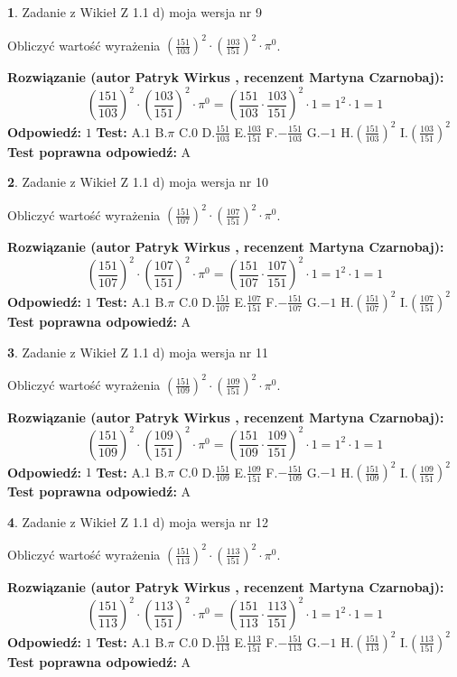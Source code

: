 \documentclass[12pt, a4paper]{article}
\theoremstyle{definition} %
\newtheorem{zad}{}
\newcommand{\zadStart}[1]{\begin{zad}#1\newline}
\newcommand{\zadStop}{\end{zad}}
\newcommand{\rozwStart}[2]{\noindent \textbf{Rozwiązanie (autor #1 , recenzent #2): }\newline}
\newcommand{\rozwStop}{\newline}
\newcommand{\odpStart}{\noindent \textbf{Odpowiedź:}\newline}
\newcommand{\odpStop}{\newline}
\newcommand{\testStart}{\noindent \textbf{Test:}\newline}
\newcommand{\testStop}{\newline}
\newcommand{\kluczStart}{\noindent \textbf{Test poprawna odpowiedź:}\newline}
\newcommand{\kluczStop}{\newline}
\begin{document}
\zadStart{Zadanie z Wikieł Z 1.1 d) moja wersja nr 9}

Obliczyć wartość wyrażenia $(\frac{151}{103})^{2} \cdot (\frac{103}{151})^{2} \cdot \pi^{0}$.
\zadStop
\rozwStart{Patryk Wirkus}{Martyna Czarnobaj}
$$(\frac{151}{103})^{2} \cdot (\frac{103}{151})^{2} \cdot \pi^{0} = (\frac{151}{103} \cdot \frac{103}{151})^{2} \cdot 1 = 1^{2} \cdot 1 = 1$$
\rozwStop
\odpStart
$1$
\odpStop
\testStart
A.$1$ B.$\pi$ C.$0$ D.$\frac{151}{103}$ E.$\frac{103}{151}$
F.$-\frac{151}{103}$ G.$-1$
H.$(\frac{151}{103})^{2}$
I.$(\frac{103}{151})^{2}$
\testStop
\kluczStart
A
\kluczStop



\zadStart{Zadanie z Wikieł Z 1.1 d) moja wersja nr 10}

Obliczyć wartość wyrażenia $(\frac{151}{107})^{2} \cdot (\frac{107}{151})^{2} \cdot \pi^{0}$.
\zadStop
\rozwStart{Patryk Wirkus}{Martyna Czarnobaj}
$$(\frac{151}{107})^{2} \cdot (\frac{107}{151})^{2} \cdot \pi^{0} = (\frac{151}{107} \cdot \frac{107}{151})^{2} \cdot 1 = 1^{2} \cdot 1 = 1$$
\rozwStop
\odpStart
$1$
\odpStop
\testStart
A.$1$ B.$\pi$ C.$0$ D.$\frac{151}{107}$ E.$\frac{107}{151}$
F.$-\frac{151}{107}$ G.$-1$
H.$(\frac{151}{107})^{2}$
I.$(\frac{107}{151})^{2}$
\testStop
\kluczStart
A
\kluczStop



\zadStart{Zadanie z Wikieł Z 1.1 d) moja wersja nr 11}

Obliczyć wartość wyrażenia $(\frac{151}{109})^{2} \cdot (\frac{109}{151})^{2} \cdot \pi^{0}$.
\zadStop
\rozwStart{Patryk Wirkus}{Martyna Czarnobaj}
$$(\frac{151}{109})^{2} \cdot (\frac{109}{151})^{2} \cdot \pi^{0} = (\frac{151}{109} \cdot \frac{109}{151})^{2} \cdot 1 = 1^{2} \cdot 1 = 1$$
\rozwStop
\odpStart
$1$
\odpStop
\testStart
A.$1$ B.$\pi$ C.$0$ D.$\frac{151}{109}$ E.$\frac{109}{151}$
F.$-\frac{151}{109}$ G.$-1$
H.$(\frac{151}{109})^{2}$
I.$(\frac{109}{151})^{2}$
\testStop
\kluczStart
A
\kluczStop



\zadStart{Zadanie z Wikieł Z 1.1 d) moja wersja nr 12}

Obliczyć wartość wyrażenia $(\frac{151}{113})^{2} \cdot (\frac{113}{151})^{2} \cdot \pi^{0}$.
\zadStop
\rozwStart{Patryk Wirkus}{Martyna Czarnobaj}
$$(\frac{151}{113})^{2} \cdot (\frac{113}{151})^{2} \cdot \pi^{0} = (\frac{151}{113} \cdot \frac{113}{151})^{2} \cdot 1 = 1^{2} \cdot 1 = 1$$
\rozwStop
\odpStart
$1$
\odpStop
\testStart
A.$1$ B.$\pi$ C.$0$ D.$\frac{151}{113}$ E.$\frac{113}{151}$
F.$-\frac{151}{113}$ G.$-1$
H.$(\frac{151}{113})^{2}$
I.$(\frac{113}{151})^{2}$
\testStop
\kluczStart
A
\kluczStop
\end{document}
